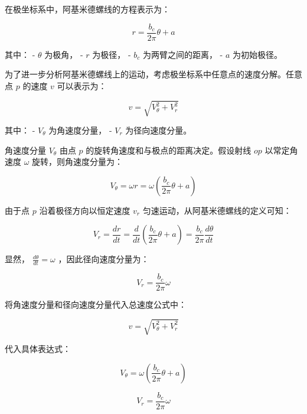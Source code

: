 \documentclass[withoutpreface, bwprint]{cumcmthesis} %
\begin{document}
在极坐标系中，阿基米德螺线的方程表示为：

\begin{equation}
    r = \frac{b_c}{2\pi}\theta + a
\end{equation}

其中： - $ \theta $ 为极角， - $ r $ 为极径， - $ b_c $ 为两臂之间的距离， - $ a $ 为初始极径。

为了进一步分析阿基米德螺线上的运动，考虑极坐标系中任意点的速度分解。任意点 $ p $ 的速度 $ v $ 可以表示为：

\begin{equation}
    v = \sqrt{V_{\theta}^2 + V_r^2}
\end{equation}

其中： - $ V_{\theta} $ 为角速度分量， - $ V_r $ 为径向速度分量。

角速度分量 $ V_{\theta} $ 由点 $ p $ 的旋转角速度和与极点的距离决定。假设射线 $ op $ 以常定角速度 $ \omega $ 旋转，则角速度分量为：

\begin{equation}
    V_{\theta} = \omega r = \omega \left( \frac{b_c}{2\pi}\theta + a \right)
\end{equation}

由于点 $ p $ 沿着极径方向以恒定速度 $ v_r $ 匀速运动，从阿基米德螺线的定义可知：

\begin{equation}
    V_r = \frac{dr}{dt} = \frac{d}{dt} \left( \frac{b_c}{2\pi} \theta + a \right) = \frac{b_c}{2\pi} \frac{d\theta}{dt}
\end{equation}

显然， $ \frac{d\theta}{dt} = \omega $ ，因此径向速度分量为：

\begin{equation}
    V_r = \frac{b_c}{2\pi} \omega
\end{equation}


将角速度分量和径向速度分量代入总速度公式中：

\begin{equation}
    v = \sqrt{V_{\theta}^2 + V_r^2}
\end{equation}

代入具体表达式：

\begin{equation}
    V_{\theta} = \omega \left( \frac{b_c}{2\pi}\theta + a \right)
\end{equation}

\begin{equation}
    V_r = \frac{b_c}{2\pi} \omega
\end{equation}
\end{document}
